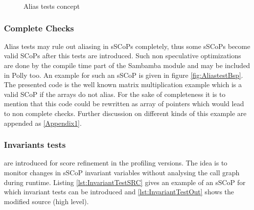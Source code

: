 \begin{figure}[htbp]
  \centering

  \lstset{frame=none}
  \resetlst
  \hspace*{5mm}
  \caption{Alias tests concept}
  \label{fig:Aliastest}  
\end{figure}


\begin{shaded}
\subsubsection*{Complete Checks}
Alias tests may rule out aliasing in sSCoPs completely, thus some sSCoPs become
valid SCoPs after this tests are introduced. Such non speculative optimizations
are done by the compile time part of the Sambamba module and may be included in 
Polly too. An example for such an sSCoP is given in figure 
\ref{fig:AliastestBsp}. The presented code is the well known
matrix multiplication example which is a valid SCoP if the arrays do not alias.
For the sake of completeness it is to mention that this code could be
rewritten as array of pointers which would lead to non complete checks. 
Further discussion on different kinds of this example are appended as 
\ref{Appendix1}.


\subsubsection{Invariants tests}
are introduced for score refinement in the profiling versions. The idea is to
monitor changes in sSCoP invariant variables without analysing the call graph 
during runtime. Listing \ref{lst:InvariantTestSRC} gives an example of an sSCoP 
for which invariant tests can be introduced and \ref{lst:InvariantTestOut} shows
the modified source (high level). 

\end{shaded}


